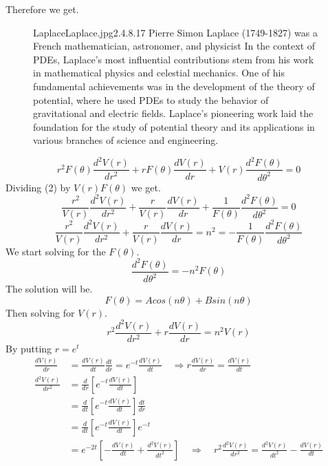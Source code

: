\documentclass[]{article}
\begin{document}
Therefore we get.
\begin{figure}[b]
    \begin{enrichment}{Laplace}{Laplace.jpg}{2.4}{.8}{.17}
        Pierre Simon Laplace (1749-1827) was a French mathematician, astronomer, and physicist 
        In the context of PDEs, Laplace's most influential contributions stem from his work in mathematical physics and celestial mechanics. One of his fundamental achievements was in the development of the theory of potential, where he used PDEs to study the behavior of gravitational and electric fields. Laplace's pioneering work laid the foundation for the study of potential theory and its applications in various branches of science and engineering.
    \end{enrichment}    
\end{figure}
\begin{equation}
r^2F(\theta)\frac{d^2 V(r)}{dr^2} +rF(\theta)\frac{d V(r)}{dr} + V(r)\frac{d^2 F(\theta)}{d\theta^2} = 0
\end{equation}
Dividing (2) by $V(r)F(\theta)$ we get.
\begin{equation}
\frac{r^2}{V(r)}\frac{d^2 V(r)}{dr^2} +\frac{r}{V(r)}\frac{d V(r)}{dr} + \frac{1}{F(\theta)}\frac{d^2 F(\theta)}{d\theta^2} = 0
\end{equation}
\[
    \frac{r^2}{V(r)}\frac{d^2 V(r)}{dr^2} +\frac{r}{V(r)}\frac{d V(r)}{dr} = n^2 = -\frac{1}{F(\theta)}\frac{d^2 F(\theta)}{d\theta^2}    
\]
We start solving for the $F(\theta)$. 
\[
    \frac{d^2 F(\theta)}{d\theta^2} = -n^2F(\theta)    
\]
The solution will be. 
\begin{equation}
F(\theta) = A cos(n\theta)+B sin(n\theta)
\end{equation}
Then solving for $V(r)$.
\[
r^2\frac{d^2 V(r)}{dr^2} +r\frac{d V(r)}{dr} = n^2V(r)    
\]
By putting $r = e^t$
\begin{align*}
\frac{dV(r)}{dr} &= \frac{dV(r)}{dt}\frac{dt}{dr} = e^{-t} \frac{dV(r)}{dt} \quad\Rightarrow  r \frac{dV(r)}{dr}=\frac{dV(r)}{dt}
\\
\frac{d^2V(r)}{dr^2} &= \frac{d}{dr}\left[e^{-t} \frac{dV(r)}{dt}\right]
\\
&=  \frac{d}{dt}\left[e^{-t} \frac{dV(r)}{dt}\right] \frac{dt}{dr} 
\\
&= \frac{d}{dt}\left[e^{-t} \frac{dV(r)}{dt}\right] e^{-t}
\\
&= e^{-2t}\left[-\frac{dV(r)}{dt}+\frac{d^2V(r)}{dt^2}\right] \quad \Rightarrow \quad r^2\frac{d^2V(r)}{dr^2} = \frac{d^2V(r)}{dt^2}-\frac{dV(r)}{dt}
\end{align*}
\end{document}
